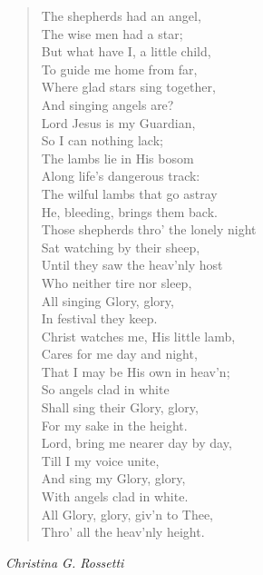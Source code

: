 
\begin{verse}
The shepherds had an angel,\\
\hspace*{2em}The wise men had a star;\\
But what have I, a little child,\\
\hspace*{2em}To guide me home from far,\\
Where glad stars sing together,\\
\hspace*{2em}And singing angels are?\\[0.7em]

Lord Jesus is my Guardian,\\
\hspace*{2em}So I can nothing lack;\\
The lambs lie in His bosom\\
\hspace*{2em}Along life's dangerous track:\\
The wilful lambs that go astray\\
\hspace*{2em}He, bleeding, brings them back.\\[0.7em]

Those shepherds thro' the lonely night\\
\hspace*{2em}Sat watching by their sheep,\\
Until they saw the heav'nly host\\
\hspace*{2em}Who neither tire nor sleep,\\
All singing Glory, glory,\\
\hspace*{2em}In festival they keep.\\[0.7em]

Christ watches me, His little lamb,\\
\hspace*{2em}Cares for me day and night,\\
That I may be His own in heav'n;\\
\hspace*{2em}So angels clad in white\\
Shall sing their Glory, glory,\\
\hspace*{2em}For my sake in the height.\\[0.7em]

Lord, bring me nearer day by day,\\
\hspace*{2em}Till I my voice unite,\\
And sing my Glory, glory,\\
\hspace*{2em}With angels clad in white.\\
All Glory, glory, giv'n to Thee,\\
\hspace*{2em}Thro' all the heav'nly height.%
\end{verse}

\vspace{0.5\baselineskip}
\noindent\textit{Christina G. Rossetti}

\newpage
